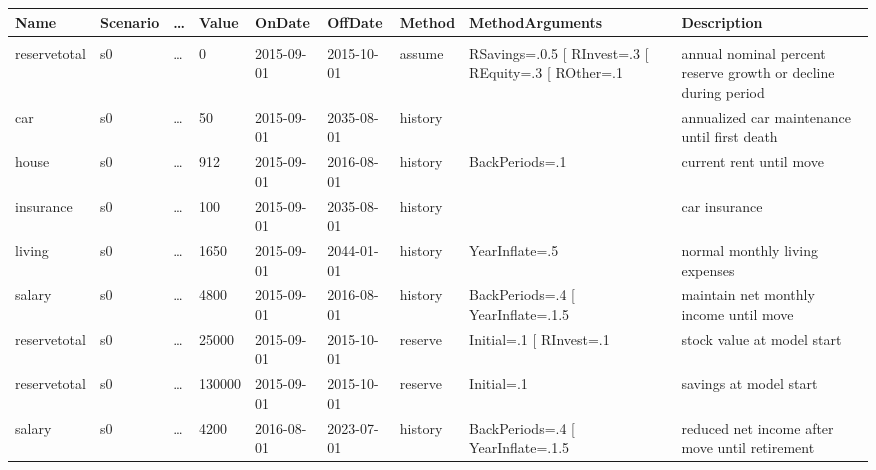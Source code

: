 \begin{sidewaystable}
\centering
\tiny
{}
\begin{tabular}{llllllllp{1.5in}}
\bf{Name} &\bf{Scenario} &\ldots &\bf{Value}  &\bf{OnDate} &\bf{OffDate} &\bf{Method} &\bf{MethodArguments} &\bf{Description}\\      \hline                                                           
&&&&&&&&\\
reservetotal &s0 &\ldots &0      &2015-09-01 &2015-10-01 &assume   &RSavings=.0.5 [ RInvest=.3 [ REquity=.3 [ ROther=.1        &annual nominal percent reserve growth or decline during period \\                 
car          &s0 &\ldots &50     &2015-09-01 &2035-08-01 &history  &                                                               &annualized car maintenance until first death  \\                                  
house        &s0 &\ldots &912    &2015-09-01 &2016-08-01 &history  &BackPeriods=.1                                                 &current rent until move \\                                                        
insurance    &s0 &\ldots &100    &2015-09-01 &2035-08-01 &history  &                                                               &car insurance  \\                                                                 
living       &s0 &\ldots &1650   &2015-09-01 &2044-01-01 &history  &YearInflate=.5                                                 &normal monthly living expenses  \\                                                
salary       &s0 &\ldots &4800   &2015-09-01 &2016-08-01 &history  &BackPeriods=.4 [ YearInflate=.1.5                              &maintain net monthly income until move \\                                         
reservetotal &s0 &\ldots &25000  &2015-09-01 &2015-10-01 &reserve  &Initial=.1 [ RInvest=.1                                       &stock value at model start  \\                                                    
reservetotal &s0 &\ldots &130000 &2015-09-01 &2015-10-01 &reserve  &Initial=.1                                                     &savings at model start \\                                                         
salary       &s0 &\ldots &4200   &2016-08-01 &2023-07-01 &history  &BackPeriods=.4 [ YearInflate=.1.5                              &reduced net income after move until retirement \\                                 

\end{tabular}
\end{sidewaystable}
